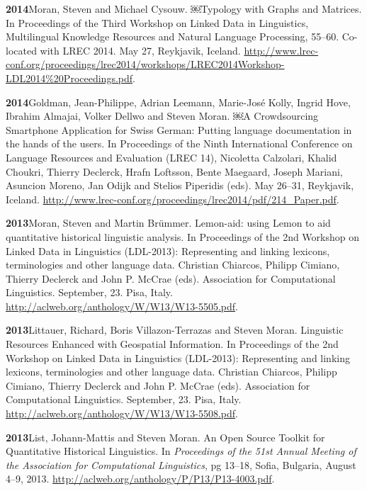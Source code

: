 \documentclass[11pt]{article}
\newcommand{\hangpara}{
 \setlength{\parindent}{0in} %
 \hangindent=0.42in %
}
\begin{document}
\vskip 6pt
\hangpara
{\bf 2014}\hspace{1ex}Moran, Steven and Michael Cysouw. ￼Typology with Graphs and Matrices. In Proceedings of the Third Workshop on Linked Data in Linguistics, Multilingual Knowledge Resources and Natural Language Processing, 55--60. Co-located with LREC 2014. May 27, Reykjavik, Iceland. \url{http://www.lrec-conf.org/proceedings/lrec2014/workshops/LREC2014Workshop-LDL2014\%20Proceedings.pdf}.

\vskip 6pt
\hangpara
{\bf 2014}\hspace{1ex}Goldman, Jean-Philippe, Adrian Leemann, Marie-Jos{\'e} Kolly, Ingrid Hove, Ibrahim Almajai, Volker Dellwo and Steven Moran. ￼A Crowdsourcing Smartphone Application for Swiss German: Putting language documentation in the hands of the users. In Proceedings of the Ninth International Conference on Language Resources and Evaluation (LREC 14), Nicoletta Calzolari, Khalid Choukri, Thierry Declerck, Hrafn Loftsson, Bente Maegaard, Joseph Mariani, Asuncion Moreno, Jan Odijk and Stelios Piperidis (eds). May 26--31, Reykjavik, Iceland. \url{http://www.lrec-conf.org/proceedings/lrec2014/pdf/214_Paper.pdf}.

\vskip 6pt
\hangpara
{\bf 2013}\hspace{1ex}Moran, Steven and Martin Brümmer. Lemon-aid: using Lemon to aid quantitative historical linguistic analysis. In Proceedings of the 2nd Workshop on Linked Data in Linguistics (LDL-2013): Representing and linking lexicons, terminologies and other language data. Christian Chiarcos, Philipp Cimiano, Thierry Declerck and John P. McCrae (eds). Association for Computational Linguistics. September, 23. Pisa, Italy. \url{http://aclweb.org/anthology/W/W13/W13-5505.pdf}.

\vskip 6pt
\hangpara
{\bf 2013}\hspace{1ex}Littauer, Richard, Boris Villazon-Terrazas and Steven Moran. Linguistic Resources Enhanced with Geospatial Information. In Proceedings of the 2nd Workshop on Linked Data in Linguistics (LDL-2013): Representing and linking lexicons, terminologies and other language data. Christian Chiarcos, Philipp Cimiano, Thierry Declerck and John P. McCrae (eds). Association for Computational Linguistics. September, 23. Pisa, Italy. \url{http://aclweb.org/anthology/W/W13/W13-5508.pdf}.

\vskip 6pt
\hangpara
{\bf 2013}\hspace{1ex}List, Johann-Mattis and Steven Moran. An Open Source Toolkit for Quantitative Historical Linguistics. In {\it Proceedings of the 51st Annual Meeting of the Association for Computational Linguistics}, pg 13--18, Sofia, Bulgaria, August 4--9, 2013. \url{http://aclweb.org/anthology/P/P13/P13-4003.pdf}.
\end{document}
